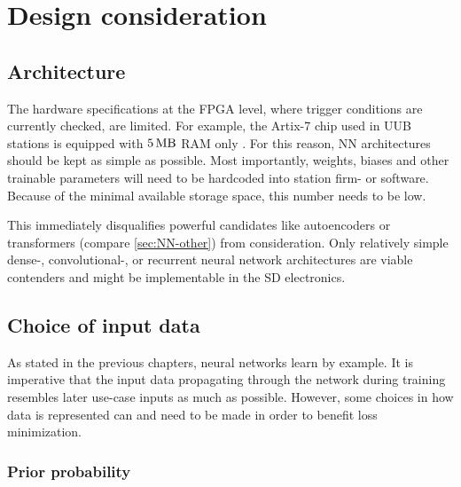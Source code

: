 \section{Design consideration}
\label{sec:design-considerations}

\subsection{Architecture}
\label{ssec:architecture}

The hardware specifications at the FPGA level, where trigger conditions are currently checked, are limited. For example, the Artix-7 chip used in UUB stations is 
equipped with $\SI{5}{\mega\byte}$ RAM only \cite{FPGAmanual}. For this reason, NN architectures should be kept as simple as possible. Most importantly, weights, 
biases and other trainable parameters will need to be hardcoded into station firm- or software. Because of the minimal available storage space, this number needs 
to be low.

This immediately disqualifies powerful candidates like autoencoders or transformers (compare \autoref{sec:NN-other}) from consideration. Only  relatively simple 
dense-, convolutional-, or recurrent neural network architectures are viable contenders and might be implementable in the SD electronics.

\subsection{Choice of input data}
\label{ssec:input-data}

As stated in the previous chapters, neural networks learn by example. It is imperative that the input data propagating through the network during training 
resembles later use-case inputs as much as possible. However, some choices in how data is represented can and need to be made in order to benefit loss 
minimization. 

\subsubsection{Prior probability}
\label{sssec:prior-discussion}

